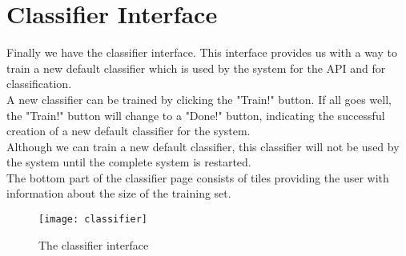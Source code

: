 \section{Classifier Interface}

Finally we have the classifier interface. This interface provides us with a way to train a new default classifier which is used by the system for the API and for classification.\\
A new classifier can be trained by clicking the "Train!" button. If all goes well, the "Train!" button will change to a "Done!" button, indicating the successful creation of a new default classifier for the system.\\ 
Although we can train a new default classifier, this classifier will not be used by the system until the complete system is restarted.\\
The bottom part of the classifier page consists of tiles providing the user with information about the size of the training set.

\begin{figure}[H]
    \centering
    \texttt{[image: classifier]}
    \caption{The classifier interface}
    \label{fig:classifier}
\end{figure}
